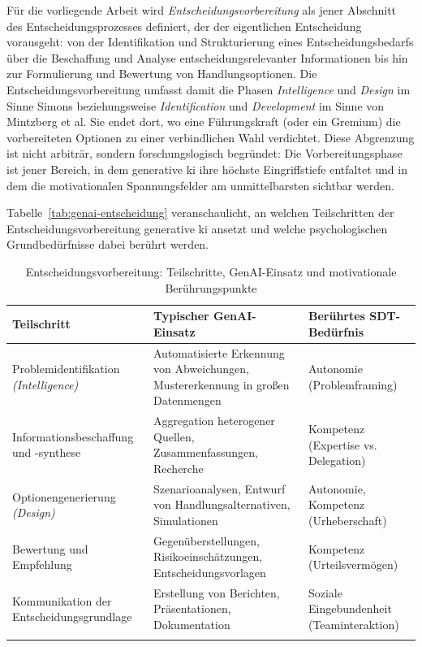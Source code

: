 Für die vorliegende Arbeit wird \textit{Entscheidungsvorbereitung} als jener Abschnitt des Entscheidungsprozesses definiert, der der eigentlichen Entscheidung vorausgeht: von der Identifikation und Strukturierung eines Entscheidungsbedarfs über die Beschaffung und Analyse entscheidungsrelevanter Informationen bis hin zur Formulierung und Bewertung von Handlungsoptionen. Die Entscheidungsvorbereitung umfasst damit die Phasen \textit{Intelligence} und \textit{Design} im Sinne Simons beziehungsweise \textit{Identification} und \textit{Development} im Sinne von Mintzberg et al. Sie endet dort, wo eine Führungskraft (oder ein Gremium) die vorbereiteten Optionen zu einer verbindlichen Wahl verdichtet. Diese Abgrenzung ist nicht arbiträr, sondern forschungslogisch begründet: Die Vorbereitungsphase ist jener Bereich, in dem generative \gls{ki} ihre höchste Eingriffstiefe entfaltet und in dem die motivationalen Spannungsfelder am unmittelbarsten sichtbar werden.

Tabelle~\ref{tab:genai-entscheidung} veranschaulicht, an welchen Teilschritten der Entscheidungsvorbereitung generative \gls{ki} ansetzt und welche psychologischen Grundbedürfnisse dabei berührt werden.

\begin{table}[ht]
\centering

\small
\begin{tabularx}{\textwidth}{>{\raggedright\arraybackslash}p{3cm} >{\raggedright\arraybackslash}X >{\raggedright\arraybackslash}p{3.2cm}}
\toprule
\textbf{Teilschritt} & \textbf{Typischer GenAI-Einsatz} & \textbf{Berührtes SDT-Bedürfnis} \\
\midrule
Problemidentifikation \newline \textit{(Intelligence)} & Automatisierte Erkennung von Abweichungen, Mustererkennung in großen Datenmengen & Autonomie \newline (Problemframing) \\
\addlinespace
Informationsbeschaffung und -synthese & Aggregation heterogener Quellen, Zusammenfassungen, Recherche & Kompetenz \newline (Expertise vs. Delegation) \\
\addlinespace
Optionengenerierung \newline \textit{(Design)} & Szenarioanalysen, Entwurf von Handlungsalternativen, Simulationen & Autonomie, Kompetenz \newline (Urheberschaft) \\
\addlinespace
Bewertung und Empfehlung & Gegenüberstellungen, Risikoeinschätzungen, Entscheidungsvorlagen & Kompetenz \newline (Urteilsvermögen) \\
\addlinespace
Kommunikation der Entscheidungsgrundlage & Erstellung von Berichten, Präsentationen, Dokumentation & Soziale Eingebundenheit \newline (Teaminteraktion) \\
\bottomrule
\caption{Entscheidungsvorbereitung: Teilschritte, GenAI-Einsatz und motivationale Berührungspunkte}
\end{tabularx}
\end{table}


